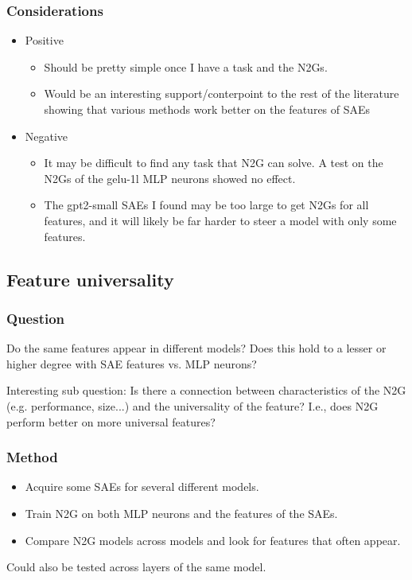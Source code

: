 \documentclass[../main.tex]{subfiles}
\begin{document}
\subsubsection{Considerations}
\begin{itemize}
    \item Positive
    \begin{itemize}
        \item Should be pretty simple once I have a task and the N2Gs.
        \item Would be an interesting support/conterpoint to the rest of the literature showing that various methods work better on the features of SAEs
    \end{itemize}
    \item Negative
    \begin{itemize}
        \item It may be difficult to find any task that N2G can solve.
        A test on the N2Gs of the gelu-1l MLP neurons showed no effect.
        \item The gpt2-small SAEs I found may be too large to get N2Gs for all features, and it will likely be far harder to steer a model with only some features.
    \end{itemize}
\end{itemize}


\subsection{Feature universality}
\subsubsection{Question}
Do the same features appear in different models?
Does this hold to a lesser or higher degree with SAE features vs. MLP neurons?

Interesting sub question: Is there a connection between characteristics of the N2G (e.g. performance, size...) and the universality of the feature? I.e., does N2G perform better on more universal features?

\subsubsection{Method}
\begin{itemize}
    \item Acquire some SAEs for several different models.
    \item Train N2G on both MLP neurons and the features of the SAEs.
    \item Compare N2G models across models and look for features that often appear.
\end{itemize}
Could also be tested across layers of the same model.
\end{document}
